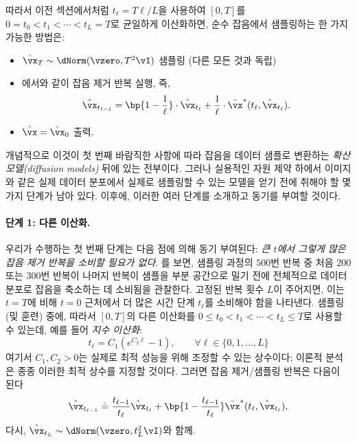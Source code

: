 \documentclass[../../book-main_ko.tex]{subfiles}
\begin{document}
따라서 이전 섹션에서처럼 \(t_{\ell} = T\ell / L\)을 사용하여 \([0, T]\)를 \(0 = t_{0} < t_{1} < \cdots < t_{L} = T\)로 균일하게 이산화하면, 순수 잡음에서 샘플링하는 한 가지 가능한 방법은:
\begin{itemize}
	\item \(\hat{\vx}_{T} \sim \dNorm(\vzero, T^{2}\vI)\) 샘플링 (다른 모든 것과 독립)
	\item {}에서와 같이 잡음 제거 반복 실행, 즉,
		\begin{equation}\label{eq:denoising-iteration-basic}
		\hat{\vx}_{t_{\ell - 1}} = \bp{1 - \frac{1}{\ell}}\cdot\hat{\vx}_{t_{\ell}} + \frac{1}{\ell}\cdot\bar{\vx}^{\ast}(t_{\ell}, \hat{\vx}_{t_{\ell}}).
	\end{equation}
	\item \(\hat{\vx} = \hat{\vx}_{0}\) 출력.
\end{itemize}
개념적으로 이것이 첫 번째 바람직한 사항에 따라 잡음을 데이터 샘플로 변환하는 \textit{확산 모델(diffusion models)} 뒤에 있는 전부이다. 그러나 실용적인 자원 제약 하에서 이미지와 같은 실제 데이터 분포에서 실제로 샘플링할 수 있는 모델을 얻기 전에 취해야 할 몇 가지 단계가 남아 있다. 이후에, 이러한 여러 단계를 소개하고 동기를 부여할 것이다.

\paragraph{단계 1: 다른 이산화.} 우리가 수행하는 첫 번째 단계는 다음 점에 의해 동기 부여된다: \textit{큰 \(t\)에서 그렇게 많은 잡음 제거 반복을 소비할 필요가 없다}. 를 보면, 샘플링 과정의 \(500\)번 반복 중 처음 \(200\) 또는 \(300\)번 반복이 나머지 반복이 샘플을 부분 공간으로 밀기 전에 전체적으로 데이터 분포로 잡음을 축소하는 데 소비됨을 관찰한다. 고정된 반복 횟수 \(L\)이 주어지면, 이는 \(t = T\)에 비해 \(t = 0\) 근처에서 더 많은 시간 단계 \(t_{\ell}\)를 소비해야 함을 나타낸다. 샘플링(및 훈련) 중에, 따라서 \([0, T]\)의 다른 이산화를 \(0 \leq t_{0} < t_{1} < \cdots < t_{L} \leq T\)로 사용할 수 있는데, 예를 들어 \textit{지수 이산화}:
\begin{equation}\label{eq:denoising_exponential_discretization}
	t_{\ell} = C_{1}(e^{C_{2}\ell} - 1), \qquad \forall \ell \in \{0, 1, \dots, L\}
\end{equation}
여기서 \(C_{1}, C_{2} > 0\)는 실제로 최적 성능을 위해 조정할 수 있는 상수이다; 이론적 분석은 종종 이러한 최적 상수를 지정할 것이다. 그러면 잡음 제거/샘플링 반복은 다음이 된다
\begin{equation}\label{eq:denoising_iteration}
	\hat{\vx}_{t_{\ell - 1}} \doteq \frac{t_{\ell - 1}}{t_{\ell}}\hat{\vx}_{t_{\ell}} + \bp{1 - \frac{t_{\ell - 1}}{t_{\ell}}}\bar{\vx}^{\ast}(t_{\ell}, \hat{\vx}_{t_{\ell}}),
\end{equation}
다시, \(\hat{\vx}_{t_{L}} \sim \dNorm(\vzero, t_{L}^{2}\vI)\)와 함께.
\end{document}
